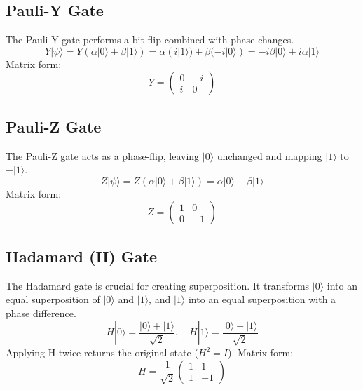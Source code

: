 \subsection*{Pauli-Y Gate}
The Pauli-Y gate performs a bit-flip combined with phase changes.
\begin{equation*}
    Y|\psi\rangle = Y(\alpha|0\rangle + \beta|1\rangle) = \alpha(i|1\rangle) + \beta(-i|0\rangle) = -i\beta|0\rangle + i\alpha|1\rangle
\end{equation*}
Matrix form:
\begin{equation*}
    Y = \begin{pmatrix} 0 & -i \\ i & 0 \end{pmatrix}
\end{equation*}

\subsection*{Pauli-Z Gate}
The Pauli-Z gate acts as a phase-flip, leaving $|0\rangle$ unchanged and mapping $|1\rangle$ to $-|1\rangle$.
\begin{equation*}
    Z|\psi\rangle = Z(\alpha|0\rangle + \beta|1\rangle) = \alpha|0\rangle - \beta|1\rangle
\end{equation*}
Matrix form:
\begin{equation*}
    Z = \begin{pmatrix} 1 & 0 \\ 0 & -1 \end{pmatrix}
\end{equation*}

\subsection*{Hadamard (H) Gate}
The Hadamard gate is crucial for creating superposition. It transforms $|0\rangle$ into an equal superposition of $|0\rangle$ and $|1\rangle$, and $|1\rangle$ into an equal superposition with a phase difference.
\begin{equation*}
    H|0\rangle = \frac{|0\rangle + |1\rangle}{\sqrt{2}}, \quad H|1\rangle = \frac{|0\rangle - |1\rangle}{\sqrt{2}}
\end{equation*}
Applying H twice returns the original state ($H^2 = I$).
Matrix form:
\begin{equation*}
    H = \frac{1}{\sqrt{2}}\begin{pmatrix} 1 & 1 \\ 1 & -1 \end{pmatrix}
\end{equation*}

